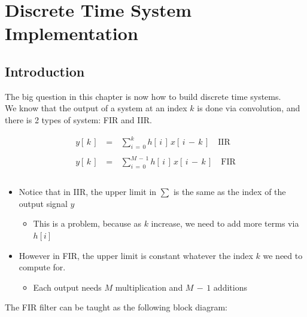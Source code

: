 \documentclass[12pt,a4paper]{book}
\begin{document}
\chapter{Discrete Time System Implementation}

\section{Introduction}

The big question in this chapter is now how to build discrete time systems.\\

We know that the output of a system at an index $k$ is done via convolution, and there is 2 types of system: FIR and IIR.

\begin{equation}
\begin{array}{rcl}
y[\, k \,] \, &=& \, \displaystyle\sum\limits_{i \, = \, 0}^{k} h[\, i\,] \, x[ \, i \, - \, k \, ] \quad \text{IIR} \\ \\
y[ \, k \,] \, &=& \, \displaystyle\sum\limits_{i \, = \, 0}^{M \, - \, 1} h[\,i \,] \, x[\, i \, - \, k \, ] \quad \text{FIR} \\ \\
\end{array}
\end{equation}


\begin{itemize}

\item Notice that in IIR, the upper limit in $\displaystyle\sum $ is the same as the index of the output signal $y$

	\begin{itemize}
	\item This is a problem, because as $k$ increase, we need to add more terms via $h[i]$
	\end{itemize}

\item However in FIR, the upper limit is constant whatever the index $k$ we need to compute for.

	\begin{itemize}
	\item Each output needs $M$ multiplication and $M \, - \, 1$ additions
	\end{itemize}

\end{itemize}

\newpage
The FIR filter can be taught as the following block diagram:
\end{document}
